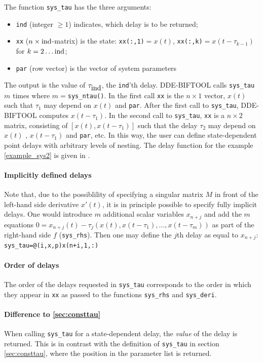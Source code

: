 \documentclass[10pt]{scrartcl}
\newcommand{\DDEBIFCODE}{\textsc{DDE-BIFTOOL}}
\newcommand{\blist}[1]{\mbox{\lstinline!#1!}}
\begin{document}
The function \blist{sys_tau} has the three arguments:
\begin{itemize}
\item \blist{ind} (integer $\geq1$) indicates, which delay is to be returned;
\item \blist{xx} ($ n\times\blist{ind}$-matrix) is the state:
  \blist{xx(:,1)}$=x(t)$, \blist{xx(:,k)}$=x(t-\tau_{k-1})$ for
  $k=2\ldots\blist{ind}$;
\item \blist{par} (row vector) is the vector of system parameters
\end{itemize}
The output is the value of $\tau_{\blist{ind}}$, the \blist{ind}'th
delay. \DDEBIFCODE{} calls \blist{sys_tau} $m$ times where
$m=$\blist{sys_ntau()}. In the first call \blist{xx} is the $n\times1$
vector, $x(t)$ such that $\tau_1$ may depend on $x(t)$ and
\blist{par}. After the first call to \blist{sys_tau}, \DDEBIFCODE{}
computes $x(t-\tau_1)$. In the second call to \blist{sys_tau},
\blist{xx} is a $n\times2$ matrix, consisting of $[x(t),x(t-\tau_1)]$
such that the delay $\tau_2$ may depend on $x(t)$ , $x(t-\tau_1)$ and
\blist{par}, etc. In this way, the user can define state-dependent
point delays with arbitrary levels of nesting. The delay function for
the example \eqref{example_sys2} is given in .

\paragraph{Implicitly defined delays}
Note that, due to the possiblility of specifying a singular matrix $M$
in front of the left-hand side derivative $x'(t)$, it is in principle
possible to specify fully implicit delays. One would introduce $m$
additional scalar variables $x_{n+j}$ and add the $m$ equations 
$0=x_{n+j}(t)-\tau_j(x(t),x(t-\tau_1),\ldots,x(t-\tau_m))$ as part of
the right-hand side $f$ (\blist{sys_rhs}). Then one may define the $j$th delay as equal to
$x_{n+j}$: \blist{sys_tau=@(i,x,p)x(n+i,1,:)}

\paragraph{Order of delays} The order of the delays
requested in \blist{sys_tau} corresponds to the order in which they
appear in \blist{xx} as passed to the functions \blist{sys_rhs} and
\blist{sys_deri}.
\paragraph{Difference to \cref{sec:consttau}} When calling
  \blist{sys_tau} for a state-dependent delay, the \emph{value} of the delay is
  returned.  This is in contrast with the definition of \blist{sys_tau}
  in section \ref{sec:consttau}, where the position in the parameter list
  is returned.
\end{document}
